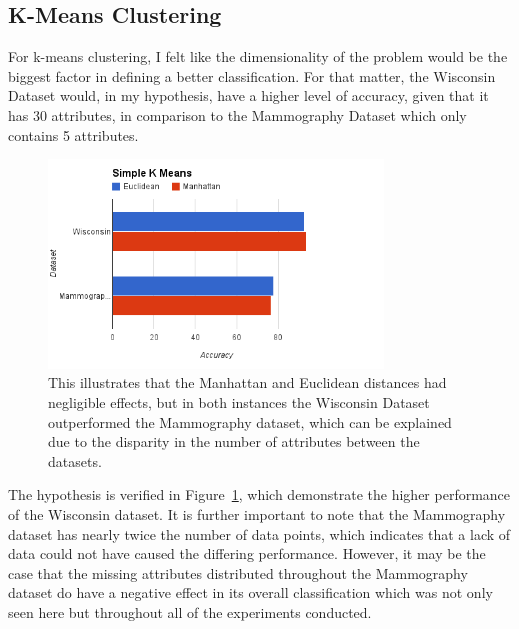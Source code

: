 \documentclass[annual]{acmsiggraph}
\begin{document}
\subsection{K-Means Clustering}
For k-means clustering, I felt like the dimensionality of the problem would be the biggest factor in defining a better classification. For that matter, the Wisconsin Dataset would, in my hypothesis, have a higher level of accuracy, given that it has 30 attributes, in comparison to the Mammography Dataset which only contains 5 attributes.
\begin{figure}[ht]
  \centering
  \includegraphics[width=3.5in]{charts/k-means-comparison.png}
  \caption{This illustrates that the Manhattan and Euclidean distances had negligible effects, but in both instances the Wisconsin Dataset outperformed the Mammography dataset, which can be explained due to the disparity in the number of attributes between the datasets.}
  \label{fig:clust1}
\end{figure}
The hypothesis is verified in Figure~\ref{fig:clust1}, which demonstrate the higher performance of the Wisconsin dataset. It is further important to note that the Mammography dataset has nearly twice the number of data points, which indicates that a lack of data could not have caused the differing performance. However, it may be the case that the missing attributes distributed throughout the Mammography dataset do have a negative effect in its overall classification which was not only seen here but throughout all of the experiments conducted.
\end{document}
